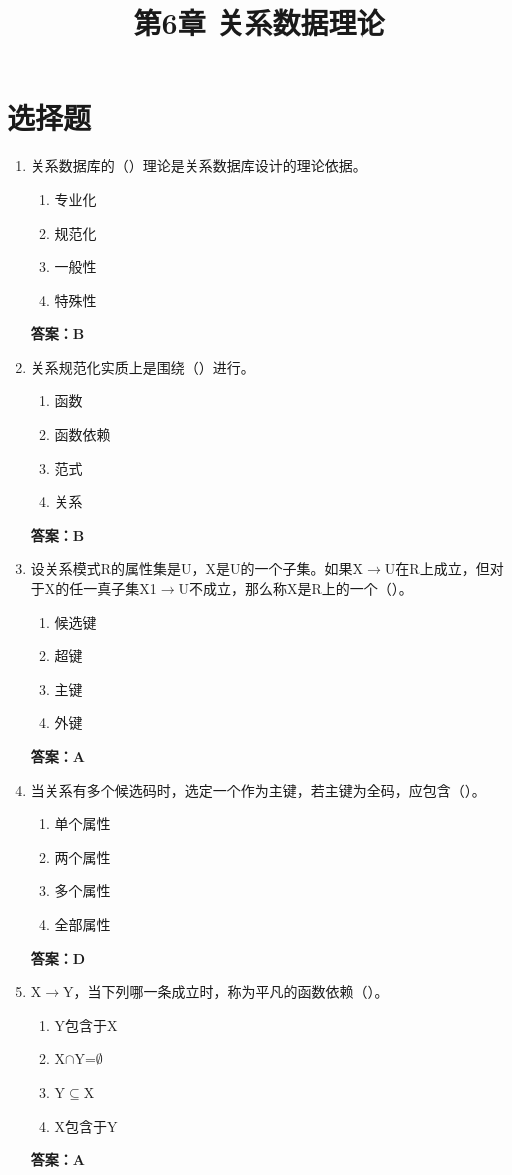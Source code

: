 \documentclass[12pt, a4paper]{article}
\title{\textbf{第6章 关系数据理论}}
\date{}
\begin{document}
\section{选择题}

\begin{enumerate}[label=\arabic*.]
	\item 关系数据库的（\quad）理论是关系数据库设计的理论依据。
	      \begin{enumerate}
		      \item 专业化
		      \item 规范化
		      \item 一般性
		      \item 特殊性
	      \end{enumerate}
	      \textbf{答案：B}

	\item 关系规范化实质上是围绕（\quad）进行。
	      \begin{enumerate}
		      \item 函数
		      \item 函数依赖
		      \item 范式
		      \item 关系
	      \end{enumerate}
	      \textbf{答案：B}

	\item 设关系模式R的属性集是U，X是U的一个子集。如果X$\to$U在R上成立，但对于X的任一真子集X1$\to$U不成立，那么称X是R上的一个（\quad）。
	      \begin{enumerate}
		      \item 候选键
		      \item 超键
		      \item 主键
		      \item 外键
	      \end{enumerate}
	      \textbf{答案：A}

	\item 当关系有多个候选码时，选定一个作为主键，若主键为全码，应包含（\quad）。
	      \begin{enumerate}
		      \item 单个属性
		      \item 两个属性
		      \item 多个属性
		      \item 全部属性
	      \end{enumerate}
	      \textbf{答案：D}

	\item X$\to$Y，当下列哪一条成立时，称为平凡的函数依赖（\quad）。
	      \begin{enumerate}
		      \item Y包含于X
		      \item X$\cap$Y=$\emptyset$
		      \item Y$\subseteq$X
		      \item X包含于Y
	      \end{enumerate}
	      \textbf{答案：A}


\end{enumerate}
\end{document}
